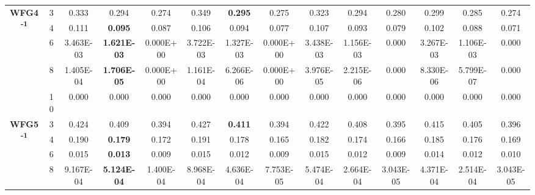 \documentclass[onecolumn,10pt]{asme2ej}
\begin{document}
\begin{table}[!htb]
\begin{tabular}{|c|c|c|c|c|c|c|c|c|c|c|c|c|c|}
	\multirow{5}{*}{\textbf{WFG4\textsuperscript{-1}}} & 3          & 0.333         & 0.294              & 0.274          & 0.349         & \textbf{0.295}     & 0.275          & 0.323         & 0.294              & 0.280          & 0.299         & 0.285              & 0.274          \\ \cline{2-14} 
	& 4          & 0.111         & \textbf{0.095}     & 0.087          & 0.106         & 0.094              & 0.077          & 0.107         & 0.093              & 0.079          & 0.102         & 0.088              & 0.071          \\ \cline{2-14} 
	& 6          & 3.463E-03     & \textbf{1.621E-03} & 0.000E+00      & 3.722E-03     & 1.327E-03          & 0.000E+00      & 3.438E-03     & 1.156E-03          & 0.000          & 3.267E-03     & 1.106E-03          & 0.000          \\ \cline{2-14} 
	& 8          & 1.405E-04     & \textbf{1.706E-05} & 0.000E+00      & 1.161E-04     & 6.266E-06          & 0.000E+00      & 3.976E-05     & 2.215E-06          & 0.000          & 8.330E-06     & 5.799E-07          & 0.000          \\ \cline{2-14} 
	& 10         & 0.000         & 0.000              & 0.000          & 0.000         & 0.000              & 0.000          & 0.000         & 0.000              & 0.000          & 0.000         & 0.000              & 0.000          \\ \hline
	\multirow{5}{*}{\textbf{WFG5\textsuperscript{-1}}} & 3          & 0.424         & 0.409              & 0.394          & 0.427         & \textbf{0.411}     & 0.394          & 0.422         & 0.408              & 0.395          & 0.415         & 0.405              & 0.396          \\ \cline{2-14} 
	& 4          & 0.190         & \textbf{0.179}     & 0.172          & 0.191         & 0.178              & 0.165          & 0.182         & 0.174              & 0.166          & 0.185         & 0.176              & 0.169          \\ \cline{2-14} 
	& 6          & 0.015         & \textbf{0.013}     & 0.009          & 0.015         & 0.012              & 0.009          & 0.015         & 0.012              & 0.009          & 0.014         & 0.012              & 0.010          \\ \cline{2-14} 
	& 8          & 9.167E-04     & \textbf{5.124E-04} & 1.400E-04      & 8.968E-04     & 4.636E-04          & 7.753E-05      & 5.474E-04     & 2.664E-04          & 3.043E-05      & 4.371E-04     & 2.514E-04          & 3.043E-05      \\ \cline{2-14} 

\end{tabular}
\end{table}
\end{document}
